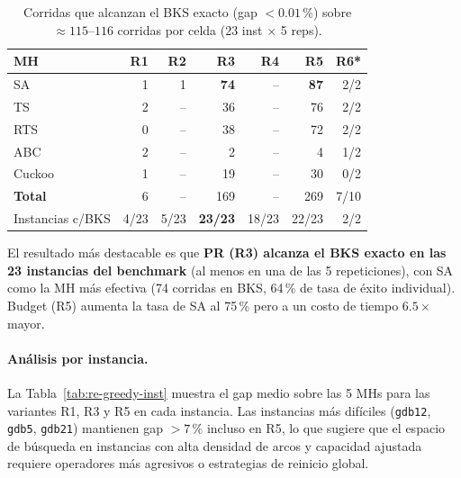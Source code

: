 \begin{table}[h]
\centering
\caption{Corridas que alcanzan el BKS exacto (gap $< 0.01$\,\%) sobre
         $\approx 115$--$116$ corridas por celda (23 inst $\times$ 5 reps).}
\label{tab:re-greedy-bks}
\small
\begin{tabular}{lrrrrrr}
\toprule
MH & R1 & R2 & R3 & R4 & R5 & R6* \\
\midrule
SA      &  1 &  1 & \textbf{74} &  -- & \textbf{87} & 2/2 \\
TS      &  2 &  -- & 36         &  -- & 76          & 2/2 \\
RTS     &  0 &  -- & 38         &  -- & 72          & 2/2 \\
ABC     &  2 &  -- &  2         &  -- &  4          & 1/2 \\
Cuckoo  &  1 &  -- & 19         &  -- & 30          & 0/2 \\
\midrule
\textbf{Total} & 6 & -- & 169 & -- & 269 & 7/10 \\
\midrule
Instancias c/BKS & 4/23 & 5/23 & \textbf{23/23} & 18/23 & 22/23 & 2/2 \\
\bottomrule
\end{tabular}
\end{table}

El resultado más destacable es que \textbf{PR (R3) alcanza el BKS exacto
en las 23 instancias del benchmark} (al menos en una de las 5
repeticiones), con SA como la MH más efectiva (74 corridas en BKS,
64\,\% de tasa de éxito individual). Budget (R5) aumenta la tasa de
SA al 75\,\% pero a un costo de tiempo $6.5\times$ mayor.

\paragraph{Análisis por instancia.}
La Tabla~\ref{tab:re-greedy-inst} muestra el gap medio sobre las 5 MHs
para las variantes R1, R3 y R5 en cada instancia. Las instancias más
difíciles (\texttt{gdb12}, \texttt{gdb5}, \texttt{gdb21}) mantienen
gap $> 7$\,\% incluso en R5, lo que sugiere que el espacio de búsqueda
en instancias con alta densidad de arcos y capacidad ajustada requiere
operadores más agresivos o estrategias de reinicio global.

